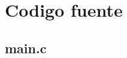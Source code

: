 \documentclass[a4paper,12pt]{article}   %
\begin{document}
     
                     
 
\pagestyle{fancy}
 
     
 
\newpage
\section{Codigo fuente}
\subsection{main.c}
\end{document}
